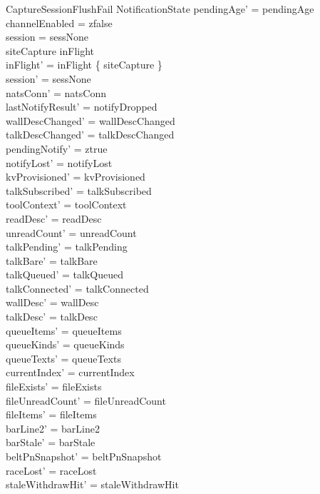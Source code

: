\documentclass[a4paper,10pt,fleqn]{article}
\begin{document}
\begin{schema}{CaptureSessionFlushFail}
  \Delta NotificationState
  \where
  pendingAge' = pendingAge \\
  channelEnabled = zfalse \\
  session = sessNone \\
  siteCapture \in inFlight \\
  inFlight' = inFlight \setminus \{ siteCapture \} \\
  session' = sessNone \\
  natsConn' = natsConn \\
  lastNotifyResult' = notifyDropped \\
  wallDescChanged' = wallDescChanged \\
  talkDescChanged' = talkDescChanged \\
  pendingNotify' = ztrue \\
  notifyLost' = notifyLost \\
  kvProvisioned' = kvProvisioned \\
  talkSubscribed' = talkSubscribed \\
  toolContext' = toolContext \\
  readDesc' = readDesc \\
  unreadCount' = unreadCount \\
  talkPending' = talkPending \\
  talkBare' = talkBare \\
  talkQueued' = talkQueued \\
  talkConnected' = talkConnected \\
  wallDesc' = wallDesc \\
  talkDesc' = talkDesc \\
  queueItems' = queueItems \\
  queueKinds' = queueKinds \\
  queueTexts' = queueTexts \\
  currentIndex' = currentIndex \\
  fileExists' = fileExists \\
  fileUnreadCount' = fileUnreadCount \\
  fileItems' = fileItems \\
  barLine2' = barLine2 \\
  barStale' = barStale \\
  beltPnSnapshot' = beltPnSnapshot \\
  raceLost' = raceLost \\
  staleWithdrawHit' = staleWithdrawHit \\

\end{schema}
\end{document}
